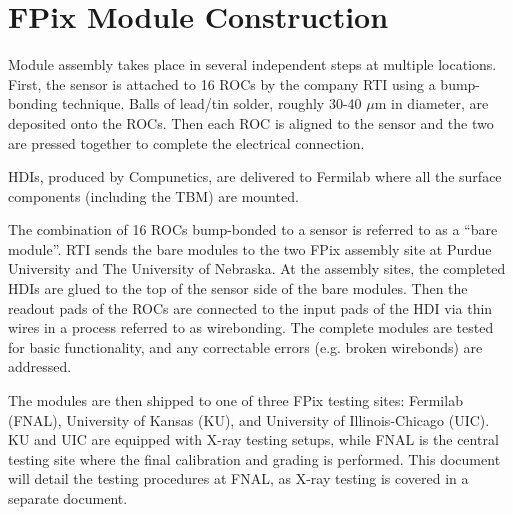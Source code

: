 \section{FPix Module Construction}
\label{s:construction}

Module assembly takes place in several independent steps at multiple locations.  
First, the sensor is attached to 16 ROCs by the company RTI using a bump-bonding technique.  
Balls of lead/tin solder, roughly 30-40 $\mu$m in diameter, are deposited onto the ROCs.  
Then each ROC is aligned to the sensor and the two are pressed together to complete the electrical connection.

HDIs, produced by Compunetics, are delivered to Fermilab where all the surface components (including the TBM) are mounted.

The combination of 16 ROCs bump-bonded to a sensor is referred to as a ``bare module''.  
RTI sends the bare modules to the two FPix assembly site at Purdue University and The University of Nebraska.  
At the assembly sites, the completed HDIs are glued to the top of the sensor side of the bare modules.  
Then the readout pads of the ROCs are connected to the input pads of the HDI via thin wires in a process referred to as wirebonding.  
The complete modules are tested for basic functionality, and any correctable errors (e.g. broken wirebonds) are addressed.

The modules are then shipped to one of three FPix testing sites:  
Fermilab (FNAL), University of Kansas (KU), and University of Illinois-Chicago (UIC).  
KU and UIC are equipped with X-ray testing setups, 
while FNAL is the central testing site where the final calibration and grading is performed.  
This document will detail the testing procedures at FNAL, as X-ray testing is covered in a separate document.
